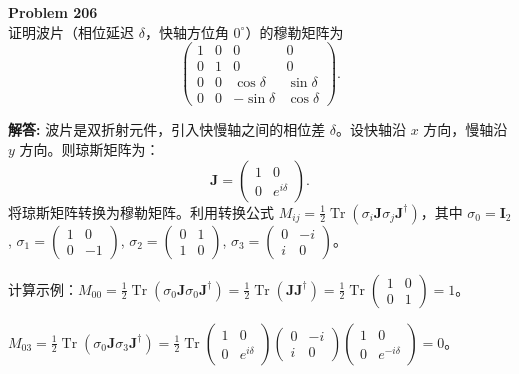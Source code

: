 \documentclass[12pt, a4paper, oneside]{ctexart}
\newenvironment{solution}{\par\noindent\textbf{解答:}\quad}{\par}
\begin{document}
\begin{mdframed}[backgroundcolor=gray!10, linewidth=0pt]
    \textbf{Problem 206} \\
    证明波片（相位延迟 $\delta$，快轴方位角 $0^\circ$）的穆勒矩阵为
    \[
    \begin{pmatrix}
        1 & 0 & 0 & 0 \\
        0 & 1 & 0 & 0 \\
        0 & 0 & \cos\delta & \sin\delta \\
        0 & 0 & -\sin\delta & \cos\delta
    \end{pmatrix}.
    \]
\end{mdframed}
\begin{solution}
    波片是双折射元件，引入快慢轴之间的相位差 $\delta$。设快轴沿 $x$ 方向，慢轴沿 $y$ 方向。则琼斯矩阵为：
    \[
    \mathbf{J} = \begin{pmatrix} 1 & 0 \\ 0 & e^{i\delta} \end{pmatrix}.
    \]
    将琼斯矩阵转换为穆勒矩阵。利用转换公式 $M_{ij} = \frac{1}{2} \operatorname{Tr}(\sigma_i \mathbf{J} \sigma_j \mathbf{J}^\dagger)$，其中 $\sigma_0 = \mathbf{I}_2$, $\sigma_1 = \begin{pmatrix}1&0\\0&-1\end{pmatrix}$, $\sigma_2 = \begin{pmatrix}0&1\\1&0\end{pmatrix}$, $\sigma_3 = \begin{pmatrix}0&-i\\i&0\end{pmatrix}$。

    计算示例：$M_{00} = \frac{1}{2} \operatorname{Tr}(\sigma_0 \mathbf{J} \sigma_0 \mathbf{J}^\dagger) = \frac{1}{2} \operatorname{Tr}(\mathbf{J} \mathbf{J}^\dagger) = \frac{1}{2} \operatorname{Tr}\begin{pmatrix}1&0\\0&1\end{pmatrix} = 1$。

    $M_{03} = \frac{1}{2} \operatorname{Tr}(\sigma_0 \mathbf{J} \sigma_3 \mathbf{J}^\dagger) = \frac{1}{2} \operatorname{Tr}\begin{pmatrix}1&0\\0&e^{i\delta}\end{pmatrix} \begin{pmatrix}0&-i\\i&0\end{pmatrix} \begin{pmatrix}1&0\\0&e^{-i\delta}\end{pmatrix} = 0$。


\end{solution}
\end{document}
